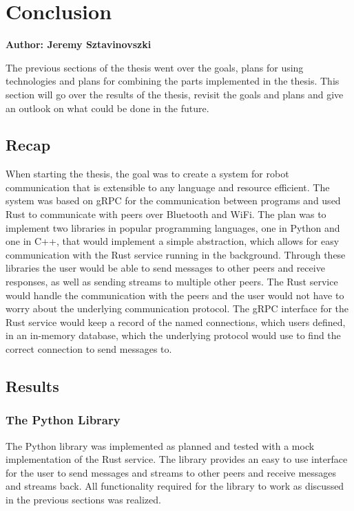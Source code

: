 \chapter{Conclusion}

\textbf{Author: Jeremy Sztavinovszki} 

The previous sections of the thesis went over the goals, plans for using technologies and plans for combining the parts implemented in the thesis.
This section will go over the results of the thesis, revisit the goals and plans and give an outlook on what could be done in the future.

\section{Recap}
When starting the thesis, the goal was to create a system for robot communication that is extensible to any language and resource efficient. The system was based on gRPC for the communication between programs
and used Rust to communicate with peers over Bluetooth and WiFi. The plan was to implement two libraries in popular programming languages, one in Python and one in C++, that would implement a simple abstraction,
which allows for easy communication with the Rust service running in the background. Through these libraries the user would be able to send messages to other peers and receive responses, as well as sending streams to multiple
other peers. The Rust service would handle the communication with the peers and the user would not have to worry about the underlying communication protocol. The gRPC interface for the Rust service would keep a record of
the named connections, which users defined, in an in-memory database, which the underlying protocol would use to find the correct connection to send messages to.

\section{Results}
\subsection{The Python Library}
The Python library was implemented as planned and tested with a mock implementation of the Rust service. The library provides an easy to use interface for the user to send messages and streams to other peers and receive messages and streams back.
All functionality required for the library to work as discussed in the previous sections was realized.

